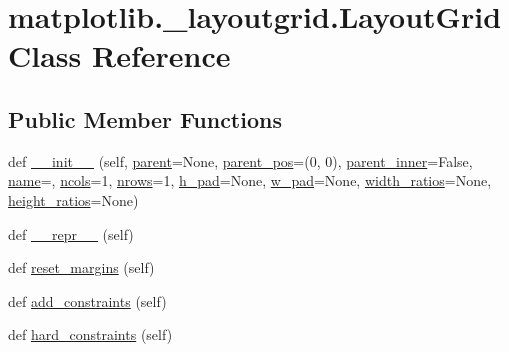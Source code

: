 \hypertarget{classmatplotlib_1_1__layoutgrid_1_1LayoutGrid}{}\section{matplotlib.\+\_\+layoutgrid.\+Layout\+Grid Class Reference}
\label{classmatplotlib_1_1__layoutgrid_1_1LayoutGrid}
\subsection*{Public Member Functions}
\begin{DoxyCompactItemize}
\item 
def \hyperlink{classmatplotlib_1_1__layoutgrid_1_1LayoutGrid_a731d39b29ceae5df4bb66abff847e3f1}{\+\_\+\+\_\+init\+\_\+\+\_\+} (self, \hyperlink{classmatplotlib_1_1__layoutgrid_1_1LayoutGrid_a0149a9bc4e90d35e33b2926f9a41d111}{parent}=None, \hyperlink{classmatplotlib_1_1__layoutgrid_1_1LayoutGrid_abcd69b762a3871f5b06ac32640ce8078}{parent\+\_\+pos}=(0, 0), \hyperlink{classmatplotlib_1_1__layoutgrid_1_1LayoutGrid_adb87f365daeae1a7ab45174d08cc47b7}{parent\+\_\+inner}=False, \hyperlink{classmatplotlib_1_1__layoutgrid_1_1LayoutGrid_aff56a1cc7902666363423be6662a3618}{name}=\textquotesingle{}\textquotesingle{}, \hyperlink{classmatplotlib_1_1__layoutgrid_1_1LayoutGrid_a2bcf4de8e1b1319a5b0e2b5df54ce5e4}{ncols}=1, \hyperlink{classmatplotlib_1_1__layoutgrid_1_1LayoutGrid_a882d6dbe5ed6085da1625f80992e0b98}{nrows}=1, \hyperlink{classmatplotlib_1_1__layoutgrid_1_1LayoutGrid_a6c1533b9163fddbef3a1ba344fa6db37}{h\+\_\+pad}=None, \hyperlink{classmatplotlib_1_1__layoutgrid_1_1LayoutGrid_a5c622ec6df633468b3d137024802a7fc}{w\+\_\+pad}=None, \hyperlink{classmatplotlib_1_1__layoutgrid_1_1LayoutGrid_a2e9321fca59f72d2399769a0d397e05e}{width\+\_\+ratios}=None, \hyperlink{classmatplotlib_1_1__layoutgrid_1_1LayoutGrid_abcc503616194a9545b70bd6de6b54c9f}{height\+\_\+ratios}=None)
\item 
def \hyperlink{classmatplotlib_1_1__layoutgrid_1_1LayoutGrid_ac417a600ff5b122d89c5d70a9da55f46}{\+\_\+\+\_\+repr\+\_\+\+\_\+} (self)
\item 
def \hyperlink{classmatplotlib_1_1__layoutgrid_1_1LayoutGrid_a903b87128c651052739fe2ba78f8bf12}{reset\+\_\+margins} (self)
\item 
def \hyperlink{classmatplotlib_1_1__layoutgrid_1_1LayoutGrid_a90f50fbb6597d0194d5735c6c93f208f}{add\+\_\+constraints} (self)
\item 
def \hyperlink{classmatplotlib_1_1__layoutgrid_1_1LayoutGrid_a202b7a7e498b7001f4bcc2357ceeace6}{hard\+\_\+constraints} (self)

\end{DoxyCompactItemize}
